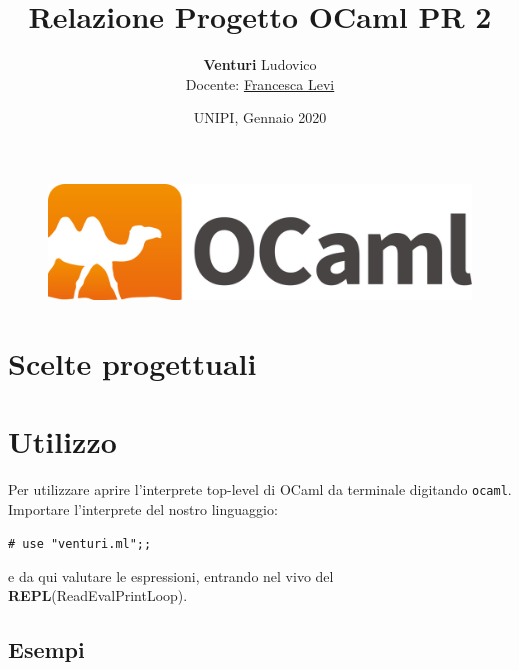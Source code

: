 \documentclass[10pt, a4paper]{article}
\title{\textbf{Relazione Progetto OCaml PR 2}}
\author{\textbf{Venturi} Ludovico\\Docente: \href{http://pages.di.unipi.it/levi/}{Francesca Levi}}
\date{UNIPI, Gennaio 2020}
\begin{document}
\maketitle
\tableofcontents
\vfill
\begin{figure}[h]
	\centering
	\includegraphics[scale=0.3]{ocaml_logo}
	\label{fig:0}
\end{figure}

\clearpage

\section{Scelte progettuali}

\section{Utilizzo}
Per utilizzare aprire l'interprete top-level di OCaml da terminale digitando \texttt{ocaml}. Importare l'interprete del nostro linguaggio:
\begin{center}
\texttt{\# use "venturi.ml";;}
\end{center}
e da qui valutare le espressioni, entrando nel vivo del \textbf{REPL}(ReadEvalPrintLoop).
\subsection{Esempi}
\end{document}
